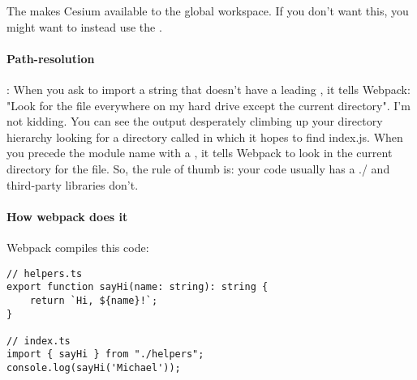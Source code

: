 The  makes Cesium available to the global workspace. If you don't want this, you might want to instead use the .

\paragraph{Path-resolution}: When you ask to import a string that doesn't have a leading , it tells Webpack: "Look for the file everywhere on my hard drive except the current directory". I'm not kidding. You can see the output desperately climbing up your directory hierarchy looking for a directory called  in which it hopes to find index.js.
When you precede the module name with a , it tells Webpack to look in the current directory for the file. So, the rule of thumb is: your code usually has a ./ and third-party libraries don't.


\paragraph{How webpack does it}
Webpack compiles this code:
\begin{lstlisting}
// helpers.ts
export function sayHi(name: string): string {
    return `Hi, ${name}!`;
}

// index.ts
import { sayHi } from "./helpers";
console.log(sayHi('Michael'));
\end{lstlisting}

